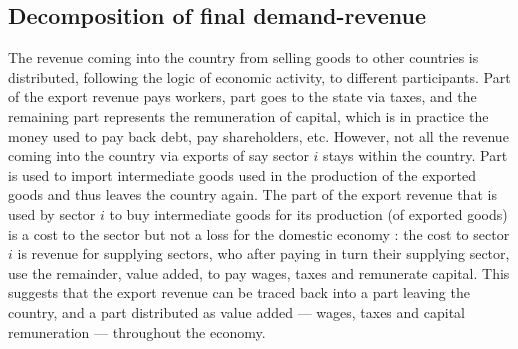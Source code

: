 \documentclass[12pt,english]{article}
\begin{document}


\subsection{Decomposition of final demand-revenue}

The revenue coming into the country from selling goods to other countries is distributed, following the logic of economic activity, to different participants. Part of the export revenue pays workers, part goes to the state via taxes, and the remaining part represents the remuneration of capital, which is in practice the money used to pay back debt, pay shareholders, etc. However, not all the revenue coming into the country via exports of say sector $i$ stays within the country. Part is used to import intermediate goods used in the production of the exported goods and thus leaves the country again. The part of the export revenue that is used by sector $i$ to buy intermediate goods for its production (of exported goods) is a cost to the sector but not a loss for the domestic economy : the cost to sector $i$ is revenue for supplying sectors, who after paying in turn their supplying sector, use the remainder, value added, to pay wages, taxes and remunerate capital. This suggests that the export revenue can be traced back into a part leaving the country, and a part distributed as value added --- wages, taxes and capital remuneration --- throughout the economy. 
\end{document}

